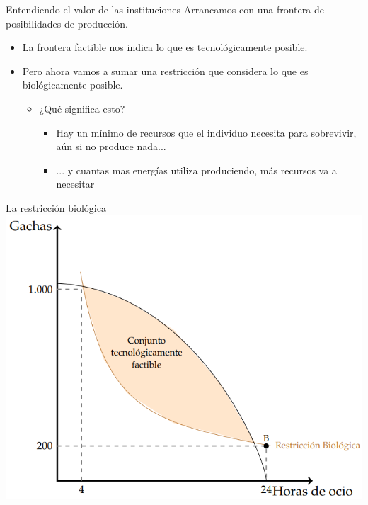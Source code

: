 \documentclass{beamer}
\begin{document}
\begin{frame}{Entendiendo el valor de las instituciones}
    Arrancamos con una frontera de posibilidades de producción.
    \begin{itemize}
    \item La frontera factible nos indica lo que es tecnológicamente posible.
    \item Pero ahora vamos a sumar una restricción que considera lo que es biológicamente posible.
        \begin{itemize}
            \item ¿Qué significa esto?
            \begin{itemize}
                \item Hay un mínimo de recursos que el individuo necesita para sobrevivir, aún si no produce nada...
                \item ... y cuantas mas energías utiliza produciendo, más recursos va a necesitar
            \end{itemize}
        \end{itemize}
    \end{itemize}
\end{frame}

\begin{frame}{La restricción biológica}
    \centering
    \includegraphics[scale=0.6]{../Figures/C19.6.png}
\end{frame}
\end{document}
